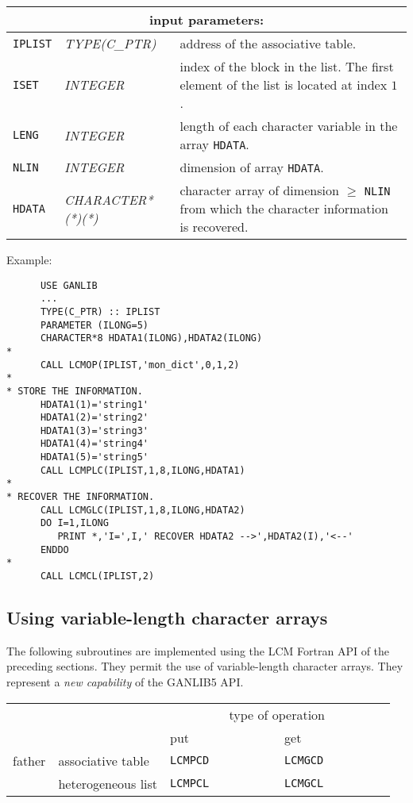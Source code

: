 \noindent
\begin{tabular}{|p{1.5cm}|p{3.5cm}|p{9.5cm}|}
\hline
\multicolumn{3}{|c|}{\bf input parameters:} \\
\hline
{\tt IPLIST} & {\it TYPE(C\_PTR)} & address of the associative table. \\
\hline
{\tt ISET} & {\it INTEGER} & index of the block in the list.
The first element of the list is located at index $1$. \\
\hline
{\tt LENG} & {\it INTEGER} & length of each character variable in the array {\tt HDATA}. \\
\hline
{\tt NLIN} & {\it INTEGER} & dimension of array {\tt HDATA}. \\
\hline
{\tt HDATA} & {\it CHARACTER*(*)(*)} & character array of dimension $\ge$ {\tt NLIN} from which the character information is recovered. \\
\hline
\end{tabular}

\vskip 0.4cm
\goodbreak

\noindent Example:
\begin{verbatim}
      USE GANLIB
      ...
      TYPE(C_PTR) :: IPLIST
      PARAMETER (ILONG=5)
      CHARACTER*8 HDATA1(ILONG),HDATA2(ILONG)
*
      CALL LCMOP(IPLIST,'mon_dict',0,1,2)
*
* STORE THE INFORMATION.
      HDATA1(1)='string1'
      HDATA1(2)='string2'
      HDATA1(3)='string3'
      HDATA1(4)='string4'
      HDATA1(5)='string5'
      CALL LCMPLC(IPLIST,1,8,ILONG,HDATA1)
*
* RECOVER THE INFORMATION.
      CALL LCMGLC(IPLIST,1,8,ILONG,HDATA2)
      DO I=1,ILONG
         PRINT *,'I=',I,' RECOVER HDATA2 -->',HDATA2(I),'<--'
      ENDDO
*
      CALL LCMCL(IPLIST,2)
\end{verbatim}

\vskip 0.8cm

\subsection{Using variable-length character arrays}

The following subroutines are implemented using the LCM Fortran API of the preceding sections. They
permit the use of variable-length character arrays. They represent a {\sl new capability} of the GANLIB5 API.

\vskip 0.4cm

\begin{center}
\begin{tabular}{|c|l|l|l|}
\cline{3-4}
\multicolumn{2}{c|}{} & \multicolumn{2}{c|}{type of operation} \\
\cline{3-4}
\multicolumn{2}{c|}{} & put~~~~~~~~~~~~~ & get~~~~~~~~~~~~~ \\
\hline
father & associative table & {\tt LCMPCD} & {\tt LCMGCD} \\
\cline{2-4}
       & heterogeneous list & {\tt LCMPCL} & {\tt LCMGCL} \\
\hline
\end{tabular}
\end{center}

